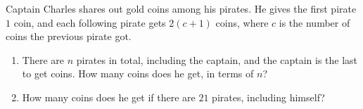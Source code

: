 Captain Charles shares out gold coins among his pirates. He gives the first pirate $1$ coin, and each following pirate gets $2(c+1)$ coins, where $c$ is the number of coins the previous pirate got.
\begin{enumerate}
\item[(a)] There are $n$ pirates in total, including the captain, and the captain is the last to get coins. How many coins does he get, in terms of $n$?
\item[(b)] How many coins does he get if there are $21$ pirates, including himself?
\end{enumerate}
